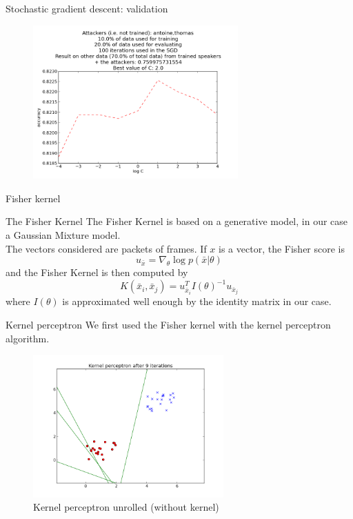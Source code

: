 \documentclass[10pt]{beamer}
\begin{document}
\begin{frame}{Stochastic gradient descent: validation}
\begin{figure}[!h]
\includegraphics[width=0.7\textwidth]{../bestC}
\end{figure}
\end{frame}

\begin{frame}{Fisher kernel}
\begin{block}{The Fisher Kernel}
The Fisher Kernel is based on a generative model, in our case a Gaussian Mixture model.\\
The vectors considered are packets of frames. If $x$ is a vector, the Fisher score is
\[u_{\bar{x}} = \nabla_{\theta} \log p (\bar{x} | \theta) \]
and the Fisher Kernel is then computed by
\[K(\bar{x}_i,\bar{x}_j) = u_{\bar{x}_i}^{T} I(\theta)^{-1} u_{\bar{x}_j}\]
where $I(\theta)$ is approximated well enough by the identity matrix in our case.
\end{block}
\end{frame}

\begin{frame}{Kernel perceptron}
We first used the Fisher kernel with the kernel perceptron algorithm.\\

\begin{figure}[!h]
\includegraphics[width=0.65\textwidth]{../rapport/img/kp_pdf}
\caption{Kernel perceptron unrolled (without kernel)}\label{/test_kp}
\end{figure}
\end{frame}
\end{document}
